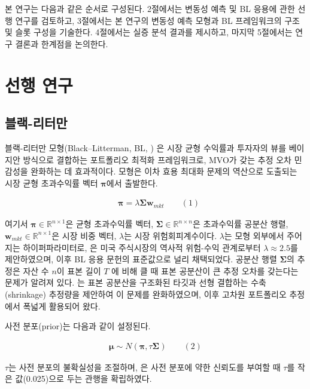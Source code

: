 \documentclass{article}
\begin{document}
본 연구는 다음과 같은 순서로 구성된다. 2절에서는 변동성 예측 및 BL 응용에 관한 선행 연구를 검토하고, 3절에서는 본 연구의 변동성 예측 모형과 BL 프레임워크의 구조 및 슬롯 구성을 기술한다. 4절에서는 실증 분석 결과를 제시하고, 마지막 5절에서는 연구 결론과 한계점을 논의한다.

\section{선행 연구}\label{sec:related_work}

\subsection{블랙-리터만}
\label{subsec:bl_review}

블랙-리터만 모형(Black–Litterman, BL, \citealp{black1992}) 은 시장 균형 수익률과 투자자의 뷰를 베이지안 방식으로 결합하는 포트폴리오 최적화 프레임워크로, MVO가 갖는 추정 오차 민감성을 완화하는 데 효과적이다. 모형은 이차 효용 최대화 문제의 역산으로 도출되는 시장 균형 초과수익률 벡터 $\boldsymbol{\pi}$에서 출발한다.

\begin{align}
    & \boldsymbol{\pi} = \lambda\boldsymbol{\Sigma}\mathbf{w}_{mkt} \qquad(1)\end{align}

여기서 $\boldsymbol{\pi} \in \mathbb{R}^{n \times 1}$은 균형 초과수익률 벡터, $\boldsymbol{\Sigma}\in \mathbb{R}^{n \times n}$은 초과수익률 공분산 행렬, $\mathbf{w}_{mkt} \in \mathbb{R}^{n \times 1}$은 시장 비중 벡터, $\lambda$는 시장 위험회피계수이다. $\lambda$는 모형 외부에서 주어지는 하이퍼파라미터로, \citet{helitterman1999}은 미국 주식시장의 역사적 위험-수익 관계로부터 $\lambda \approx 2.5$를 제안하였으며, 이후 BL 응용 문헌의 표준값으로 널리 채택되었다. 공분산 행렬 $\boldsymbol{\Sigma}$의 추정은 자산 수 $n$이 표본 길이 $T$ 에 비해 클 때 표본 공분산이 큰 추정 오차를 갖는다는 문제가 알려져 있다. \citet{ledoitwolf2004}는 표본 공분산을 구조화된 타깃과 선형 결합하는 수축(shrinkage) 추정량을 제안하여 이 문제를 완화하였으며, 이후 고차원 포트폴리오 추정에서 폭넓게 활용되어 왔다.

사전 분포(prior)는 다음과 같이 설정된다.

\begin{align}
    \boldsymbol{\mu} \sim N(\boldsymbol{\pi}, \tau\boldsymbol{\Sigma}) \qquad(2)\end{align}

$\tau$는 사전 분포의 불확실성을 조절하며, \citet{helitterman1999}은 사전 분포에 약한 신뢰도를 부여할 때 $\tau$를 작은 값(0.025)으로 두는 관행을 확립하였다.
\end{document}
